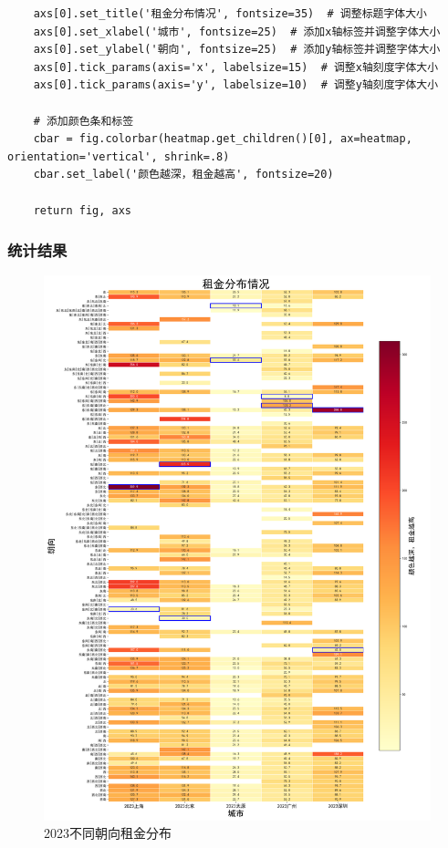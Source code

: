 \documentclass[lang=cn,11pt,a4paper]{elegantpaper}
\begin{document}
\begin{lstlisting}
    axs[0].set_title('租金分布情况', fontsize=35)  # 调整标题字体大小
    axs[0].set_xlabel('城市', fontsize=25)  # 添加x轴标签并调整字体大小
    axs[0].set_ylabel('朝向', fontsize=25)  # 添加y轴标签并调整字体大小
    axs[0].tick_params(axis='x', labelsize=15)  # 调整x轴刻度字体大小
    axs[0].tick_params(axis='y', labelsize=10)  # 调整y轴刻度字体大小

    # 添加颜色条和标签
    cbar = fig.colorbar(heatmap.get_children()[0], ax=heatmap, orientation='vertical', shrink=.8)
    cbar.set_label('颜色越深，租金越高', fontsize=20)

    return fig, axs
\end{lstlisting}

\subsubsection{统计结果}

\clearpage

\begin{figure}[H]
    \centering
    \includegraphics[height=0.95\textheight]{image/2023不同朝向租金分布.png}
    \caption{2023不同朝向租金分布}
\end{figure}
\end{document}
